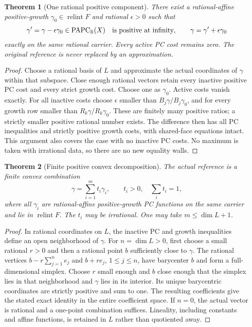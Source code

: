 \documentclass[11pt]{article}
\newtheorem{theorem}{Theorem}
\newcommand{\R}{\mathbb R}
\newcommand{\PAPC}{\operatorname{PAPC}}
\newcommand{\relint}{\operatorname{relint}}
\begin{document}
\begin{theorem}[One rational positive component]\label{component}
There exist a rational-affine positive-growth
$\gamma_0\in\relint F$ and rational $\epsilon>0$ such that
\[
 \gamma'=\gamma-\epsilon\gamma_0\in\PAPC_\R(X)
 \quad\hbox{is positive at infinity},\qquad
 \gamma=\gamma'+\epsilon\gamma_0
\]
exactly on the same rational carrier. Every active PC cost remains
zero. The original reference is never replaced by an approximation.
\end{theorem}
\begin{proof}
Choose a rational basis of $L$ and approximate the actual coordinates
of $\gamma$ within that subspace. Close enough rational vectors retain
every inactive positive PC cost and every strict growth cost. Choose
one as $\gamma_0$. Active costs vanish exactly. For all inactive
costs choose $\epsilon$ smaller than
$B_j\gamma/B_j\gamma_0$, and for every growth row smaller than
$R_k\gamma/R_k\gamma_0$. These are finitely many positive ratios;
a strictly smaller positive rational number exists. The difference
then has all PC inequalities and strictly positive growth costs,
with shared-face equations intact. This argument also covers the
case with no inactive PC costs. No maximum is taken with irrational
data, so there are no new equality walls.
\end{proof}

\begin{theorem}[Finite positive convex decomposition]\label{simplex}
The actual reference is a finite convex combination
\[
 \gamma=\sum_{i=1}^m t_i\gamma_i,\qquad t_i>0,\quad\sum_i t_i=1,
\]
where all $\gamma_i$ are rational-affine positive-growth PC functions
on the same carrier and lie in $\relint F$. The $t_i$ may be
irrational. One may take $m\leq\dim L+1$.
\end{theorem}
\begin{proof}
In rational coordinates on $L$, the inactive PC and growth
inequalities define an open neighborhood of $\gamma$.
For $n=\dim L>0$, first choose a small rational $r>0$ and then
a rational point $b$ sufficiently close to $\gamma$. The rational vertices
$b-r\sum_{j=1}^n e_j$ and $b+r e_j$, $1\leq j\leq n$, have
barycenter $b$ and form a full-dimensional simplex. Choose $r$ small
enough and $b$ close enough that the simplex lies in that neighborhood
and $\gamma$ lies in its interior.
Its unique barycentric coordinates are strictly positive and sum
to one. The resulting coefficients give the stated exact identity
in the entire coefficient space. If $n=0$, the actual vector is
rational and a one-point combination suffices. Lineality, including
constants and affine functions, is retained in $L$ rather than
quotiented away.
\end{proof}
\end{document}
